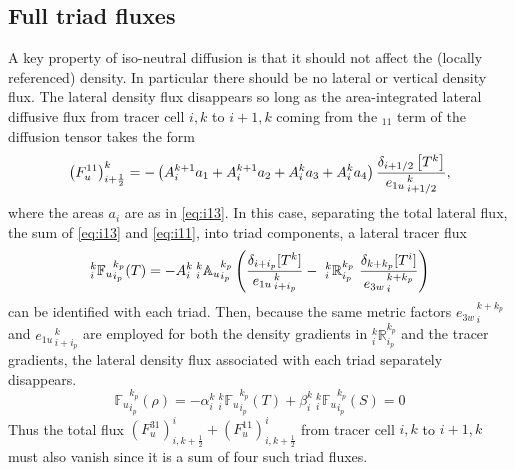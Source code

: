 \documentclass[../main/NEMO_manual]{subfiles}
\begin{document}
\subsection{Full triad fluxes}

A key property of iso-neutral diffusion is that it should not affect the (locally referenced) density.
In particular there should be no lateral or vertical density flux.
The lateral density flux disappears so long as the area-integrated lateral diffusive flux from
tracer cell $i,k$ to $i+1,k$ coming from the $_{11}$ term of the diffusion tensor takes the form
\begin{equation}
  \label{eq:i11}
  \left( F_u^{11} \right) _{i+\frac{1}{2}} ^{k} =
  - \left( {A}_i^{k+1} a_{1} + {A}_i^{k+1} a_{2} + {A}_i^k
    a_{3} + {A}_i^k a_{4} \right)
  \frac{\delta_{i+1/2} \left[ T^k\right]}{{e_{1u}}_{\,i+1/2}^{\,k}},
\end{equation}
where the areas $a_i$ are as in \autoref{eq:i13}.
In this case, separating the total lateral flux, the sum of \autoref{eq:i13} and \autoref{eq:i11},
into triad components, a lateral tracer flux
\begin{equation}
  \label{eq:latflux-triad}
  _i^k {\mathbb{F}_u}_{i_p}^{k_p} (T) = - {A}_i^k{ \:}_i^k{\mathbb{A}_u}_{i_p}^{k_p}
  \left(
    \frac{ \delta_{i+ i_p}[T^k] }{ {e_{1u}}_{\,i + i_p}^{\,k} }
    -\ {_i^k\mathbb{R}_{i_p}^{k_p}} \
    \frac{ \delta_{k+k_p} [T^i] }{{e_{3w}}_{\,i}^{\,k+k_p} }
  \right)
\end{equation}
can be identified with each triad.
Then, because the same metric factors ${e_{3w}}_{\,i}^{\,k+k_p}$ and ${e_{1u}}_{\,i+i_p}^{\,k}$ are employed for both
the density gradients in $ _i^k \mathbb{R}_{i_p}^{k_p}$ and the tracer gradients,
the lateral density flux associated with each triad separately disappears.
\begin{equation}
  \label{eq:latflux-rho}
  {\mathbb{F}_u}_{i_p}^{k_p} (\rho)=-\alpha _i^k {\:}_i^k {\mathbb{F}_u}_{i_p}^{k_p} (T) + \beta_i^k {\:}_i^k {\mathbb{F}_u}_{i_p}^{k_p} (S)=0
\end{equation}
Thus the total flux $\left( F_u^{31} \right) ^i _{i,k+\frac{1}{2}} + \left( F_u^{11} \right) ^i _{i,k+\frac{1}{2}}$ from
tracer cell $i,k$ to $i+1,k$ must also vanish since it is a sum of four such triad fluxes.
\end{document}
